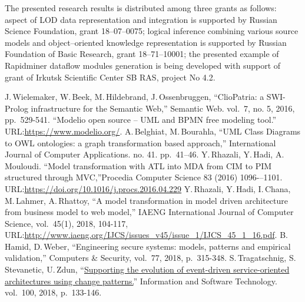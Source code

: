 \documentclass[conference]{IEEEtran} \IEEEoverridecommandlockouts
\begin{document}
The presented research results is distributed among three grants as follows: aspect of LOD data representation and integration is supported by Russian Science Foundation, grant 18--07--0075; logical inference combining various source models and object--oriented knowledge representation is supported by Russian Foundation of Basic Research, grant 18--71--10001; the presented example of Rapidminer dataflow modules generation is being developed with support of grant of Irkutsk Scientific Center SB RAS, project No 4.2. 

\begin{thebibliography}{99} 

 J.\,Wielemaker, W.\,Beek, M.\,Hildebrand, J.\,Ossenbruggen, ``ClioPatria: a SWI-Prolog infrastructure for the Semantic Web,'' Semantic Web. vol.~7, no. 5, 2016, pp.~529-541.  ``Modelio open source -- UML and BPMN free modeling tool.'' URL:\url{https://www.modelio.org/}.  A.\,Belghiat, M.\,Bourahla, ``UML Class Diagrams to OWL ontologies: a graph transformation based approach,'' International Journal of Computer Applications. no. 41. pp.~41--46. Y.\,Rhazali, Y.\,Hadi, A.\,Mouloudi. ``Model transformation with ATL into MDA from CIM to PIM structured through MVC,''Procedia Computer Science 83 (2016) 1096-–1101. URL:\url{https://doi.org/10.1016/j.procs.2016.04.229}  Y.\,Rhazali, Y.\,Hadi, I.\,Chana, M.\,Lahmer, A.\,Rhattoy, ``A model transformation in model driven architecture from business model to web model,'' IAENG International Journal of Computer Science, vol.~45(1), 2018, 104-117, URL:\url{http://www.iaeng.org/IJCS/issues_v45/issue_1/IJCS_45_1_16.pdf}.  B.\,Hamid, D.\,Weber, ``Engineering secure systems: models, patterns and empirical validation,'' Computers \& Security, vol.~77, 2018, p.~315-348.  S.\,Tragatschnig, S.\,Stevanetic, U.\,Zdun, ``\href{https://www.sciencedirect.com/science/article/abs/pii/S0950584916303251}{Supporting the evolution of event-driven service-oriented architectures using change patterns.}'' Information and Software Technology. vol.~100, 2018, p.~133-146. 


\end{thebibliography}
\end{document}
